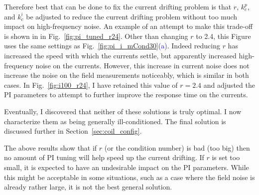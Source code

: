Therefore best that can be done to fix the current drifting problem is that $r$, $k_c^p$, and $k_c^i$ be adjusted to reduce the current
drifting problem without too much impact on high-frequency noise.  An
example of an attempt to make this trade-off is shown in in
Fig.~\ref{fig:pi_tuned_r24}.  Other than changing $r$ to 2.4, this
Figure uses the same settings as
Fig.~\ref{fig:pi_i_mCond30}\textcolor{blue}{(a)}.  Indeed reducing $r$
has increased the speed with which the currents settle, but apparently increased high-frequency noise on the currents.
However, this increase in current noise does not increase
the noise on the field measurements noticeably, which is similar in both cases.
In Fig.~\ref{fig:i100_r24}, I have retained this value of $r=2.4$ and
adjusted the PI parameters to attempt to further improve the response
time on the currents.


Eventually, I discovered that neither of these solutions is truly
optimal.  I now characterize them as being generally
ill-conditioned.  The final solution is discussed further in
Section~\ref{sec:coil_config}.

The above results show that if $r$ (or the condition number) is bad
(too big) then no amount of PI tuning will help speed up the current
drifting. If $r$ is set too small, it is expected to have an undesirable impact on the PI parameters. While this might be acceptable in some
situations, such as a case where the field noise is already rather large, it is
not the best general solution.
 




